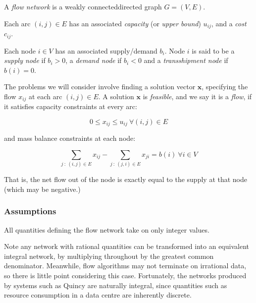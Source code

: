 A \emph{flow network} is a weakly connected\footnotemark directed graph $G=(V,E)$.

Each arc $(i,j)\in E$ has an associated \emph{capacity} (or \emph{upper	bound}\footnotemark) $u_{ij}$, and a \emph{cost} $c_{ij}$.

Each node $i\in V$ has an associated supply/demand $b_{i}$. Node $i$ is said to be a \emph{supply node} if $b_{i}>0$, a \emph{demand	node} if $b_{i}<0$ and a \emph{transshipment node} if $b(i)=0$.

The problems we will consider involve finding a solution vector $\mathbf{x}$,
specifying the flow $x_{ij}$ at each arc $(i,j)\in E$. A solution
$\mathbf{x}$ is \emph{feasible}, and we say it is a \emph{flow}, if it satisfies capacity constraints at every arc:

\begin{equation} \label{eq:capacity-constraints}
0\leq x_{ij}\leq u_{ij}\:\forall(i,j)\in E
\end{equation}

and mass balance constraints at each node:

\begin{equation} \label{eq:mass-balance}
\sum_{j\::\:(i,j)\in E}x_{ij}-\sum_{j\::\:(j,i)\in E}x_{ji}=b(i)\:\forall i\in V
\end{equation}

That is, the net flow out of the node is exactly equal to the supply
at that node (which may be negative.)

\subsubsection{Assumptions}

\begin{assumption}[Integrality] \label{assumption:integrality}
All quantities defining the flow network take on only integer values.\end{assumption}
    
Note any network with rational quantities can be transformed into an equivalent integral network, by multiplying throughout by the greatest common denominator. Meanwhile, flow algorithms may not terminate on irrational data, so there is little point considering this case. Fortunately, the networks produced by systems such as Quincy are naturally integral, since quantities such as resource consumption in a data centre are inherently discrete. \\

